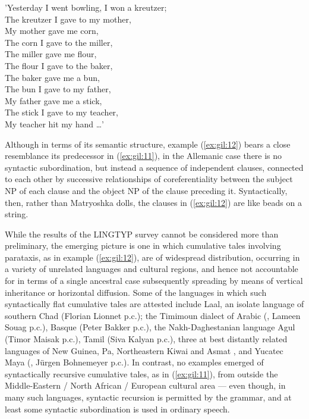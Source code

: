 \documentclass[output=paper,colorlinks,citecolor=brown
]{langscibook}
\begin{document}
'Yesterday I went bowling, I won a kreutzer;\\
The kreutzer I gave to my mother, \\
My mother gave me corn, \\
The corn I gave to the miller, \\
The miller gave me flour, \\
The flour I gave to the baker, \\
The baker gave me a bun, \\
The bun I gave to my father, \\
My father gave me a stick, \\
The stick I gave to my teacher, \\
My teacher hit my hand  \ldots ' \\

\z

Although in terms of its semantic structure, example (\ref{ex:gil:12}) bears a close resemblance its predecessor in (\ref{ex:gil:11}), in the Allemanic case there is no syntactic subordination, but instead a sequence of independent clauses, connected to each other by successive relationships of coreferentiality between the subject NP of each clause and the object NP of the clause preceding it.  Syntactically, then, rather than Matryoshka dolls, the clauses in (\ref{ex:gil:12}) are like beads on a string.

While the results of the LINGTYP survey cannot be considered more than preliminary, the emerging picture is one in which cumulative tales involving parataxis, as in example (\ref{ex:gil:12}), are of widespread distribution, occurring in a variety of unrelated languages and cultural regions, and hence not accountable for in terms of a single ancestral case subsequently spreading by means of vertical inheritance or horizontal diffusion.  Some of the languages in which such syntactically flat cumulative tales are attested include Laal, an isolate language of southern Chad (Florian Lionnet p.c.); the Timimoun dialect of Arabic (\cite{mammeri1985ahellil}, Lameen Souag p.c.), Basque (Peter Bakker p.c.), the Nakh-Daghestanian language Agul (Timor Maisak p.c.), Tamil (Siva Kalyan p.c.), three at best distantly related languages of New Guinea, Pa, Northeastern Kiwai and Asmat \citep{voorhoeve2010remarkable}, and Yucatec Maya (\cite[180—186]{smailus1975textos}, Jürgen Bohnemeyer p.c.).  In contrast, no examples emerged of syntactically recursive cumulative tales, as in (\ref{ex:gil:11}), from outside the Middle-Eastern / North African / European cultural area — even though, in many such languages, syntactic recursion is permitted by the grammar, and at least some syntactic subordination is used in ordinary speech.  
\end{document}
